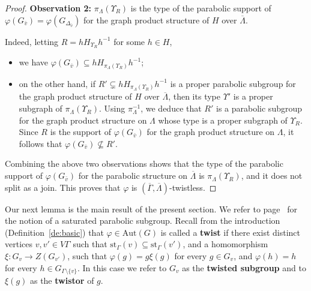\documentclass[a4paper,english,11pt]{article}
\theoremstyle{definition}
\theoremstyle{remark}
\newcommand{\st}{\mathrm{st}}
\newcommand{\Aut}{\mathrm{Aut}}
\newcommand{\twistor}{\xi}
\newcommand{\deffont}[1]{\textbf{#1}}
\begin{document}
\begin{proof}
\textbf{Observation 2:} $\pi_\Lambda(\Upsilon_R)$ is the type of the parabolic support of $\varphi(G_{\bar v})=\varphi(G_{\Delta_{\bar v}})$ for the graph product structure of $H$ over $\overline{\Lambda}$.

Indeed, letting $R=hH_{\Upsilon_R}h^{-1}$ for some $h\in H$,
\begin{itemize}
\item we have $\varphi(G_{\bar v})\subseteq h H_{\pi_{\Lambda}(\Upsilon_R)}h^{-1}$;
\item on the other hand, if $R'\subsetneq h H_{\pi_{\Lambda}(\Upsilon_R)}h^{-1}$ is a proper parabolic subgroup for the graph product structure of $H$ over $\overline{\Lambda}$, then its type $\Upsilon'$ is a proper subgraph of $\pi_{\Lambda}(\Upsilon_R)$. Using $\pi_\Lambda^{-1}$, we deduce that $R'$ is a parabolic subgroup for the graph product structure on $\Lambda$ whose type is a proper subgraph of $\Upsilon_R$. Since $R$ is the support of $\varphi(G_{\bar v})$ for the graph product structure on $\Lambda$, it follows that $\varphi(G_{\bar v})\not\subseteq R'$.
\end{itemize}

\medskip

Combining the above two observations shows that the type of the parabolic support of $\varphi(G_{\bar v})$ for the parabolic structure on $\overline{\Lambda}$ is $\pi_\Lambda(\Upsilon_R)$, and it does not split as a join. This proves that $\varphi$ is $(\overline{\Gamma},\overline{\Lambda})$-twistless.
\end{proof}

Our next lemma is the main result of the present section. We refer to page~\pageref{de:saturated} for the notion of a saturated parabolic subgroup. Recall from the introduction (Definition~\ref{de:basic}) that $\varphi\in \Aut(G)$ is called a \deffont{twist} if there exist distinct vertices $v,v'\in V\Gamma$ such that $\st_\Gamma(v)\subseteq\st_\Gamma(v')$, and a homomorphism $\twistor:G_v\to Z(G_{v'})$, such that $\varphi(g)=g\twistor(g)$ for every $g\in G_v$, and $\varphi(h)=h$ for every $h\in G_{\Gamma\setminus\{v\}}$. In this case we refer to $G_v$ as the \deffont{twisted subgroup} and to $\twistor(g)$ as the \deffont{twistor} of $g$. \label{def:twistor}
\end{document}

